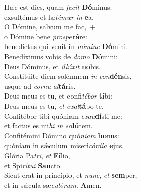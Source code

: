 \oddverse Hæc est dies, quam \textit{fe}\textit{cit} \textbf{Dó}minus:~\*\\
\oddverse exsultémus et læ\textit{té}\textit{mur} \textit{in} \textbf{e}a.\\
\evenverse O Dómine, salvum me fac,~+\\
\evenverse  o Dómine bene \textit{pro}\textit{spe}\textbf{rá}re:~\*\\
\evenverse benedíctus qui venit in \textit{nó}\textit{mi}\textit{ne} \textbf{Dó}mini.\\
\oddverse Benedíximus vobis de \textit{do}\textit{mo} \textbf{Dó}mini:~\*\\
\oddverse Deus Dóminus, et \textit{il}\textit{lú}\textit{xit} \textbf{no}bis.\\
\evenverse Constitúite diem solémnem \textit{in} \textit{con}\textbf{dén}sis,~\*\\
\evenverse usque ad \textit{cor}\textit{nu} \textit{al}\textbf{tá}ris.\\
\oddverse Deus meus es tu, et confi\textit{té}\textit{bor} \textbf{ti}bi:~\*\\
\oddverse Deus meus es tu, \textit{et} \textit{e}\textit{xal}\textbf{tá}bo te.\\
\evenverse Confitébor tibi quóniam \textit{e}\textit{xau}\textbf{dí}sti me:~\*\\
\evenverse et factus es mi\textit{hi} \textit{in} \textit{sa}\textbf{lú}tem.\\
\oddverse Confitémini Dómino quó\textit{ni}\textit{am} \textbf{bo}nus:~\*\\
\oddverse quóniam in sǽculum miseri\textit{cór}\textit{di}\textit{a} \textbf{e}jus.\\
\evenverse Glória Pa\textit{tri}, \textit{et} \textbf{Fí}lio,~\*\\
\evenverse et Spi\textit{rí}\textit{tu}\textit{i} \textbf{San}cto.\\
\oddverse Sicut erat in princípio, et \textit{nunc}, \textit{et} \textbf{sem}per,~\*\\
\oddverse et in sǽcula sæ\textit{cu}\textit{ló}\textit{rum}. \textbf{A}men.\\
